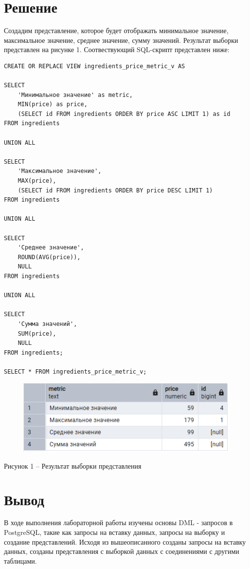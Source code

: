 \documentclass[a4paper,14pt]{extarticle}
\begin{document}
  \pagebreak
  \section*{Решение}
  Создадим представление, которое будет отображать минимальное значение, максимальное значение, среднее значение, сумму значений. Результат выборки представлен на рисунке 1. Соотвествующий SQL-скрипт представлен ниже:

  \noindent
  \begin{Verbatim}[tabsize=4,fontsize=\small]
CREATE OR REPLACE VIEW ingredients_price_metric_v AS

SELECT
    'Минимальное значение' as metric,
    MIN(price) as price,
    (SELECT id FROM ingredients ORDER BY price ASC LIMIT 1) as id
FROM ingredients

UNION ALL

SELECT
    'Максимальное значение',
    MAX(price),
    (SELECT id FROM ingredients ORDER BY price DESC LIMIT 1)
FROM ingredients

UNION ALL

SELECT
    'Среднее значение',
    ROUND(AVG(price)),
    NULL
FROM ingredients

UNION ALL

SELECT
    'Сумма значений',
    SUM(price),
    NULL
FROM ingredients;

SELECT * FROM ingredients_price_metric_v;
  \end{Verbatim}

  \begin{figure}[h]
    \centering
    \includegraphics[width=0.75\linewidth]{img/view-1}
  \end{figure}
  \begin{center}
    Рисунок 1 – Результат выборки представления
  \end{center}

  \section*{Вывод}
  В ходе выполнения лабораторной работы изучены основы DML - запросов в PostgreSQL, такие как запросы на вставку данных, запросы на выборку и создание представлений. Исходя из вышеописанного созданы запросы на вставку данных, созданы представления с выборкой данных с соединениями с другими таблицами.
\end{document}
